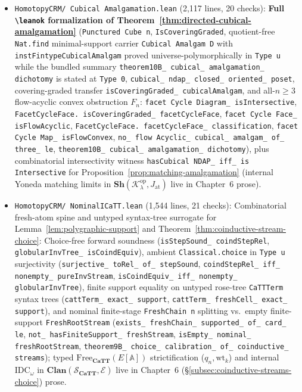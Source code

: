 \begin{itemize}
  \item \texttt{HomotopyCRM/ Cubical Amalgamation.lean} (2,117 lines, 20 checks): \textbf{Full \texttt{\textbackslash leanok} formalization of Theorem~\ref{thm:directed-cubical-amalgamation}} (\texttt{Punctured Cube n}, \texttt{IsCoveringGraded}, quotient-free \texttt{Nat.find} minimal-support carrier \texttt{Cubical Amalgam D} with \texttt{instFintypeCubicalAmalgam} proved universe-polymorphically in \texttt{Type~u} while the bundled summary \texttt{theorem10B\_ cubical\_ amalgamation\_ dichotomy} is stated at \texttt{Type~0}, \texttt{cubical\_ ndap\_ closed\_ oriented\_ poset}, covering-graded transfer \texttt{isCoveringGraded\_ cubicalAmalgam}, and all-$n \ge 3$ flow-acyclic convex obstruction $F_n$: \texttt{facet Cycle Diagram\_ isIntersective}, \texttt{FacetCycleFace. isCoveringGraded\_ facetCycleFace}, \texttt{facet Cycle Face\_ isFlowAcyclic}, \texttt{FacetCycleFace. facetCycleFace\_ classification}, \texttt{facet Cycle Map\_ isFlowConvex}, \texttt{no\_ flow Acyclic\_ cubical\_ amalgam\_ of\_ three\_ le}, \texttt{theorem10B\_ cubical\_ amalgamation\_ dichotomy}), plus combinatorial intersectivity witness \texttt{hasCubical NDAP\_ iff\_ is Intersective} for Proposition~\ref{prop:matching-amalgamation} (internal Yoneda matching limits in $\mathbf{Sh}(\mathcal{K}_\lambda^{\mathrm{op}}, J_{\mathrm{at}})$ live in Chapter~6 prose).
  \item \texttt{HomotopyCRM/ NominalICaTT.lean} (1,544 lines, 21 checks): Combinatorial fresh-atom spine and untyped syntax-tree surrogate for Lemma~\ref{lem:polygraphic-support} and Theorem~\ref{thm:coinductive-stream-choice}: Choice-free forward soundness (\texttt{isStepSound\_ coindStepRel}, \texttt{globularInvTree\_ isCoindEquiv}), ambient \texttt{Classical.choice} in \texttt{Type~u} surjectivity (\texttt{surjective\_ toRel\_ of\_ stepSound}, \texttt{coindStepRel\_ iff\_ nonempty\_ pureInvStream}, \texttt{isCoindEquiv\_ iff\_ nonempty\_ globularInvTree}), finite support equality on untyped rose-tree \texttt{CaTTTerm} syntax trees (\texttt{cattTerm\_ exact\_ support}, \texttt{cattTerm\_ freshCell\_ exact\_ support}), and nominal finite-stage \texttt{FreshChain n} splitting vs.\ empty finite-support \texttt{FreshRootStream} (\texttt{exists\_ freshChain\_ supported\_ of\_ card\_ le}, \texttt{not\_ hasFiniteSupport\_ freshStream}, \texttt{isEmpty\_ nominal\_ freshRootStream}, \texttt{theorem9B\_ choice\_ calibration\_ of\_ coinductive\_ streams}); typed $\mathrm{Free}_{\mathbf{CaTT}}(E[\mathbb{A}])$ strictification ($q_n, \mathrm{wt}_k$) and internal $\mathrm{IDC}_\omega$ in $\mathbf{Clan}(\mathcal{S}_{\mathbf{CaTT}}, \mathcal{E})$ live in Chapter~6 (\S\ref{subsec:coinductive-streams-choice}) prose.

\end{itemize}
